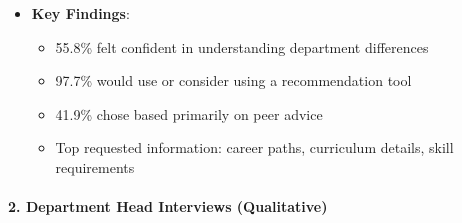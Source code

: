 \documentclass[12pt, a4paper]{article}
\begin{document}
\begin{itemize}[leftmargin=1.5em, itemsep=3pt]
\begin{itemize}[leftmargin=1.5em, itemsep=2pt]
        \item Descriptive statistics (percentages, means) for quantitative responses
        \item Thematic analysis for open-ended text responses
        \item Cross-tabulation by department to identify patterns
    \end{itemize}
    \item \textbf{Key Findings}:
    \begin{itemize}[leftmargin=1.5em, itemsep=2pt]
        \item 55.8\% felt confident in understanding department differences
        \item 97.7\% would use or consider using a recommendation tool
        \item 41.9\% chose based primarily on peer advice
        \item Top requested information: career paths, curriculum details, skill requirements
    \end{itemize}
\end{itemize}

\paragraph{2. Department Head Interviews (Qualitative)}
\end{document}
